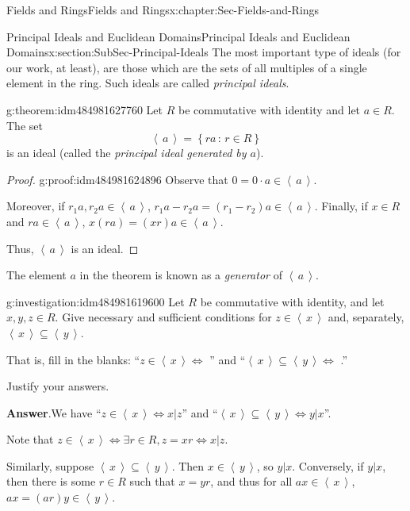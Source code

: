 \documentclass[oneside,10pt,]{book}
\newcommand{\blocktitlefont}{\relax}
\numberwithin{equation}{section}
\newcommand{\ideal}[1]{\left\langle\, #1 \,\right\rangle}
\newcommand{\setof}[2]{{\left\{#1\,\colon\,#2\right\}}}
\begin{document}
\begin{chapterptx}{Fields and Rings}{}{Fields and Rings}{}{}{x:chapter:Sec-Fields-and-Rings}
\begin{sectionptx}{Principal Ideals and Euclidean Domains}{}{Principal Ideals and Euclidean Domains}{}{}{x:section:SubSec-Principal-Ideals}
The most important type of ideals (for our work, at least), are those which are the sets of all multiples of a single element in the ring. Such ideals are called \emph{principal ideals}.%
\begin{theorem}{}{}{g:theorem:idm484981627760}%
Let \(R\) be commutative with identity and let \(a\in R\). The set%
\begin{equation*}
\ideal{a} = \setof{ra}{r\in R}
\end{equation*}
is an ideal (called the \emph{principal ideal generated by \(a\)}).%
\end{theorem}
\begin{proof}{}{g:proof:idm484981624896}
Observe that \(0 = 0\cdot a \in \ideal{a}\).%
\par
Moreover, if \(r_1 a, r_2 a\in \ideal{a}\), \(r_1 a - r_2 a = (r_1 - r_2)a \in \ideal{a}\). Finally, if \(x\in R\) and \(r a\in \ideal{a}\), \(x (ra) = (xr) a \in \ideal{a}\).%
\par
Thus, \(\ideal{a}\) is an ideal.%
\end{proof}
The element \(a\) in the theorem is known as a \emph{generator} of \(\ideal{a}\).%
\begin{investigation}{}{g:investigation:idm484981619600}%
Let \(R\) be commutative with identity, and let \(x,y,z\in R\). Give necessary and sufficient conditions for \(z\in \ideal{x}\) and, separately, \(\ideal{x} \subseteq \ideal{y}\).%
\par
That is, fill in the blanks: ``\(z\in \ideal{x} \Leftrightarrow\) \textunderscore{}\textunderscore{}\textunderscore{}\textunderscore{}\textunderscore{}\textunderscore{}\textunderscore{}\textunderscore{}\textunderscore{}'' and ``\(\ideal{x}\subseteq \ideal{y} \Leftrightarrow\) \textunderscore{}\textunderscore{}\textunderscore{}\textunderscore{}\textunderscore{}\textunderscore{}\textunderscore{}\textunderscore{}\textunderscore{}.''%
\par
Justify your answers.%
\par\smallskip%
\noindent\textbf{\blocktitlefont Answer}.\hypertarget{g:answer:idm484981615040}{}\quad{}We have ``\(z\in \ideal{x} \Leftrightarrow x|z\)'' and ``\(\ideal{x}\subseteq \ideal{y} \Leftrightarrow y|x\)''\footnotemark{}.%
\par
Note that \(z\in \ideal{x} \Leftrightarrow \exists r\in R, z = xr \Leftrightarrow x|z\).%
\par
Similarly, suppose \(\ideal{x}\subseteq \ideal{y}\). Then \(x\in \ideal{y}\), so \(y|x\). Conversely, if \(y|x\), then there is some \(r\in R\) such that \(x = yr\), and thus for all \(ax\in \ideal{x}\), \(ax = (ar)y \in \ideal{y}\).%

\end{investigation}
\end{sectionptx}
\end{chapterptx}
\end{document}
